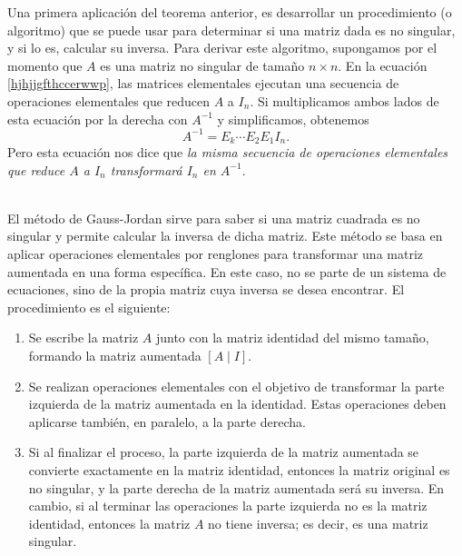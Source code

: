 Una primera aplicación del teorema anterior, es desarrollar un procedimiento (o algoritmo) que se puede usar para determinar si una matriz dada es no singular, y si lo es, calcular su inversa. Para derivar este algoritmo, supongamos por el momento que $A$ es una matriz no singular de tamaño $n \times n$. En la ecuación \eqref{hjhjjgfthccerwwp}, las matrices elementales ejecutan una secuencia de operaciones elementales que reducen $A$ a $I_n$. Si multiplicamos ambos lados de esta ecuación por la derecha con $A^{-1}$ y simplificamos, obtenemos
$$A^{-1} = E_k \cdots E_2 E_1 I_n.$$
Pero esta ecuación nos dice que \textit{la misma secuencia de operaciones elementales que reduce $A$ a $I_n$ transformará $I_n$ en $A^{-1}$}.

\begin{adjustwidth}{-7.6cm}{-2cm}
    \begin{tcolorbox}[
        theorem style=change break,
        enhanced,
        breakable,
        boxrule=0pt,
        frame hidden,
        left = 1.8cm,
        right = 1.8cm,
        top=4mm,
        bottom=2mm,
        colback=black!7!white,
        coltitle=black,
        attach title to upper={\ },
        sharp corners,
        borderline north={1.5pt}{0pt}{black},
        title = {Método de Gauss-Jordan para hallar la inversa de una matriz:},
        fonttitle=\selectfont\Lato\bfseries\LARGE,
        fontupper=\normalsize
    ]
        \,\\[4mm]
        El método de Gauss-Jordan sirve para saber si una matriz cuadrada es no singular y permite calcular la inversa de dicha matriz. Este método se basa en aplicar operaciones elementales por renglones para transformar una matriz aumentada en una forma específica. En este caso, no se parte de un sistema de ecuaciones, sino de la propia matriz cuya inversa se desea encontrar. El procedimiento es el siguiente:\vspace{0.3cm}
        \begin{enumerate}
            \item Se escribe la matriz $A$ junto con la matriz identidad del mismo tamaño, formando la matriz aumentada $[A \mid I]$.
            \item Se realizan operaciones elementales con el objetivo de transformar la parte izquierda de la matriz aumentada en la identidad. Estas operaciones deben aplicarse también, en paralelo, a la parte derecha.
            \item Si al finalizar el proceso, la parte izquierda de la matriz aumentada se convierte exactamente en la matriz identidad, entonces la matriz original es no singular, y la parte derecha de la matriz aumentada será su inversa. En cambio, si al terminar las operaciones la parte izquierda no es la matriz identidad, entonces la matriz $A$ no tiene inversa; es decir, es una matriz singular.
        \end{enumerate}
    \end{tcolorbox}
\end{adjustwidth}

